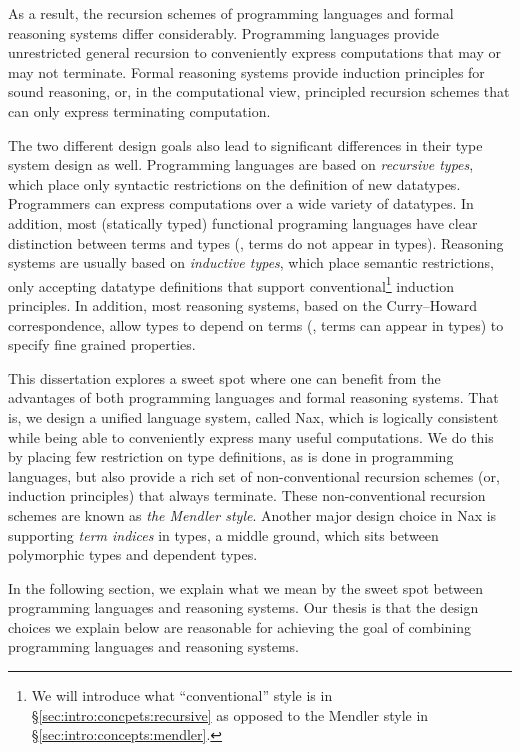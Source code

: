 As a result, the recursion schemes of programming languages and
formal reasoning systems differ considerably.
Programming languages provide unrestricted general recursion
to conveniently express computations that may or may not terminate.
Formal reasoning systems provide induction principles for sound reasoning,
or, in the computational view, principled recursion schemes
that can only express terminating computation.

The two different design goals also lead to significant differences
in their type system design as well.
Programming languages are based on \emph{recursive types},
which place only syntactic restrictions on the definition of new datatypes.
Programmers can express computations over a wide variety of datatypes.
In addition, most (statically typed) functional programing languages have
clear distinction between terms and types (\ie, terms do not appear in types).
Reasoning systems are usually based on \emph{inductive types},
which place semantic restrictions, only accepting datatype definitions
that support conventional\footnote{We will introduce
	what ``conventional'' style is in \S\ref{sec:intro:concpets:recursive}
	as opposed to the Mendler style in \S\ref{sec:intro:concepts:mendler}.
	} induction principles.
In addition, most reasoning systems, based on the Curry--Howard correspondence,
allow types to depend on terms (\ie, terms can appear in types) to specify
fine grained properties.

This dissertation explores a sweet spot where one can benefit from
the advantages of both programming languages and formal reasoning systems.
That is, we design a unified language system, called Nax, which is
logically consistent while being able to conveniently express
many useful computations. We do this by placing few restriction on type definitions,
as is done in programming languages, but also provide a rich set of
non-conventional recursion schemes (or, induction principles) that
always terminate. These non-conventional recursion schemes are known as
\emph{the Mendler style}. Another major design choice in Nax is
supporting \emph{term indices} in types, a middle ground, which sits between
polymorphic types and dependent types.

In the following section, we explain what we mean by the sweet spot between
programming languages and reasoning systems. Our thesis is that
the design choices we explain below are reasonable for achieving
the goal of combining programming languages and reasoning systems.


